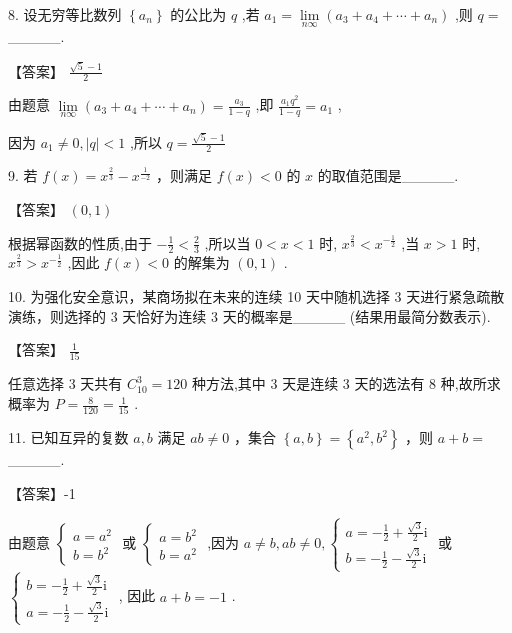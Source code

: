 \documentclass[10pt]{article}
\begin{document}
8. 设无穷等比数列 \(\left\{  {a}_{n}\right\}\) 的公比为 \(q\) ,若 \({a}_{1} = \mathop{\lim }\limits_{{n\infty }}\left( {{a}_{3} + {a}_{4} + \cdots  + {a}_{n}}\right)\) ,则 \(q =\) \_\_\_\_\_.

【答案】 \(\frac{\sqrt{5} - 1}{2}\)

由题意 \(\mathop{\lim }\limits_{{n\infty }}\left( {{a}_{3} + {a}_{4} + \cdots  + {a}_{n}}\right)  = \frac{{a}_{3}}{1 - q}\) ,即 \(\frac{{a}_{1}{q}^{2}}{1 - q} = {a}_{1}\) ,

因为 \({a}_{1} \neq  0,\left| q\right|  < 1\) ,所以 \(q = \frac{\sqrt{5} - 1}{2}\)

9. 若 \(f\left( x\right)  = {x}^{\frac{2}{3}} - {x}^{\frac{1}{-2}}\) ，则满足 \(f\left( x\right)  < 0\) 的 \(x\) 的取值范围是\_\_\_\_\_.

【答案】 \(\left( {0,1}\right)\)

根据幂函数的性质,由于 \(- \frac{1}{2} < \frac{2}{3}\) ,所以当 \(0 < x < 1\) 时, \({x}^{\frac{2}{3}} < {x}^{-\frac{1}{2}}\) ,当 \(x > 1\) 时, \({x}^{\frac{2}{3}} > {x}^{-\frac{1}{2}}\) ,因此 \(f\left( x\right)  < 0\) 的解集为 \(\left( {0,1}\right)\) .

10. 为强化安全意识，某商场拟在未来的连续 10 天中随机选择 3 天进行紧急疏散演练，则选择的 3 天恰好为连续 3 天的概率是\_\_\_\_\_ (结果用最简分数表示).

【答案】 \(\frac{1}{15}\)

任意选择 3 天共有 \({C}_{10}^{3} = {120}\) 种方法,其中 3 天是连续 3 天的选法有 8 种,故所求概率为 \(P = \frac{8}{120} = \frac{1}{15}\) .

11. 已知互异的复数 \(a,b\) 满足 \({ab} \neq  0\) ，集合 \(\left\{  {a,b}\right\}   = \left\{  {{a}^{2},{b}^{2}}\right\}\) ，则 \(a + b =\) \_\_\_\_\_.

【答案】-1

由题意 \(\left\{  \begin{array}{l} a = {a}^{2} \\  b = {b}^{2} \end{array}\right.\) 或 \(\left\{  \begin{array}{l} a = {b}^{2} \\  b = {a}^{2} \end{array}\right.\) ,因为 \(a \neq  b,{ab} \neq  0,\left\{  \begin{array}{l} a =  - \frac{1}{2} + \frac{\sqrt{3}}{2}\mathrm{i} \\  b =  - \frac{1}{2} - \frac{\sqrt{3}}{2}\mathrm{i} \end{array}\right.\) 或 \(\left\{  \begin{array}{l} b =  - \frac{1}{2} + \frac{\sqrt{3}}{2}\mathrm{i} \\  a =  - \frac{1}{2} - \frac{\sqrt{3}}{2}\mathrm{i} \end{array}\right.\) , 因此 \(a + b =  - 1\) .
\end{document}

